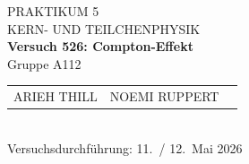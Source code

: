 \documentclass[%
paper=a4,       %
fontsize=11pt,  %
ngerman         %
]{scrreprt}
\begin{document}
\begin{titlepage}
  \centering
  \vspace*{2cm}
  
  {\Large PRAKTIKUM 5}\\[0.5cm]
  {\large KERN- UND TEILCHENPHYSIK }\\[1cm]
  
  {\LARGE\bfseries Versuch 526: Compton-Effekt}\\[1cm]
  
  Gruppe A112\\[1cm]
  
  \begin{tabular}{lll}
    ARIEH THILL & NOEMI RUPPERT  \\
  \end{tabular}\\[2cm]
  
  Versuchsdurchführung: 11.~/ 12.~Mai 2026
  
  \vfill
\end{titlepage}

\tableofcontents
\clearpage
\clearpage
\setcounter{page}{1}
 
 
 
 
 
 
 
 


\appendix
\printbibliography{}
%
\end{document}
